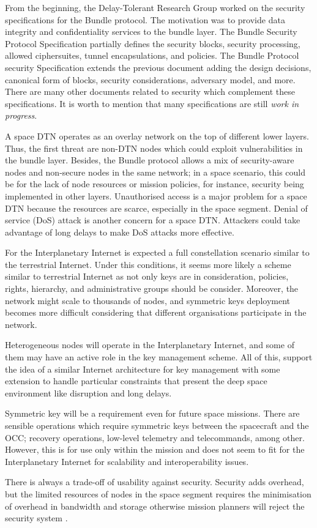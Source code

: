  From the beginning, the Delay-Tolerant Research Group worked on the security specifications for the Bundle protocol. The motivation was to provide data integrity and confidentiality services to the bundle layer. The Bundle Security Protocol Specification \cite{rfc6257} partially defines the security blocks, security processing, allowed ciphersuites, tunnel encapsulations, and policies. The Bundle Protocol security Specification \cite{ietf-dtn-bpsec-07} extends the previous document adding the design decisions, canonical form of blocks, security considerations, adversary model, and more. There are many other documents related to security which complement these specifications.  It is worth to mention that many specifications are still \textit{work in progress}.
 
 A space DTN operates as an overlay network on the top of different lower layers. Thus, the first threat are non-DTN nodes which could exploit vulnerabilities in the bundle layer. Besides, the Bundle protocol allows a mix of security-aware nodes and non-secure nodes in the same network; in a space scenario, this could be for the lack of node resources or mission policies, for instance, security being implemented in other layers. Unauthorised access is a major problem for a space DTN because the resources are scarce, especially in the space segment. Denial of service (DoS) attack is another concern for a space DTN. Attackers could take advantage of long delays to make DoS attacks more effective. 
 
 
 
 
For the Interplanetary Internet is expected a full constellation scenario similar to the terrestrial Internet. Under this conditions, it seems more likely a scheme similar to terrestrial Internet as not only keys are in consideration, policies, rights, hierarchy,  and administrative groups should be consider. Moreover, the network might scale to thousands of nodes, and symmetric keys deployment becomes more difficult considering that different organisations participate in the network.   

Heterogeneous nodes will operate in the Interplanetary Internet, and some of them may have an active role in the key management scheme. All of this, support the idea of a similar Internet architecture for key management with some extension to handle particular constraints that present the deep space environment like disruption and long delays. 


Symmetric key will be a requirement even for future space missions. There are sensible operations which require symmetric keys between the spacecraft and the OCC; recovery operations, low-level telemetry and telecommands, among other.  However, this is for use only within the mission and does not seem to fit for the Interplanetary Internet for scalability and interoperability issues. 



There is always a trade-off of usability against security. Security adds overhead, but the limited resources of nodes in the space segment requires the minimisation of overhead in bandwidth and storage otherwise mission planners will reject the security system \cite{book2012architecture}. 